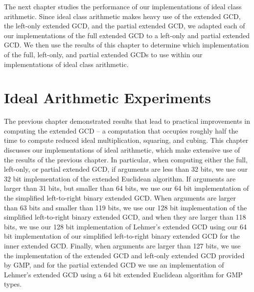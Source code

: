 \documentclass{ucalgthes1}
\theoremstyle{definition}
\begin{document}
The next chapter studies the performance of our implementations of ideal class arithmetic.  Since ideal class arithmetic makes heavy use of the extended GCD, the left-only extended GCD, and the partial extended GCD, we adapted each of our implementations of the full extended GCD to a left-only and partial extended GCD.  We then use the results of this chapter to determine which implementation of the full, left-only, and partial extended GCDs to use within our implementations of ideal class arithmetic.


\chapter{Ideal Arithmetic Experiments}
\label{chap:idealExperiments}

The previous chapter demonstrated results that lead to practical improvements in computing the extended GCD -- a computation that occupies roughly half the time to compute reduced ideal multiplication, squaring, and cubing.  This chapter discusses our implementations of ideal arithmetic, which make extensive use of the results of the previous chapter.  In particular, when computing either the full, left-only, or partial extended GCD, if arguments are less than 32 bits, we use our 32 bit implementation of the extended Euclidean algorithm.  If arguments are larger than 31 bits, but smaller than 64 bits, we use our 64 bit implementation of the simplified left-to-right binary extended GCD.  When arguments are larger than 63 bits and smaller than 119 bits, we use our 128 bit implementation of the simplified left-to-right binary extended GCD, and when they are larger than 118 bits, we use our 128 bit implementation of Lehmer's extended GCD using our 64 bit implementation of our simplified left-to-right binary extended GCD for the inner extended GCD.  Finally, when arguments are larger than 127 bits, we use the implementation of the extended GCD and left-only extended GCD provided by GMP, and for the partial extended GCD we use an implementation of Lehmer's extended GCD using a 64 bit extended Euclidean algorithm for GMP types.
\end{document}
